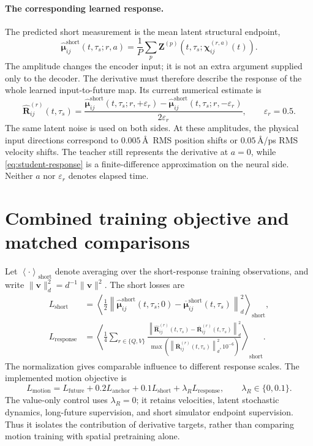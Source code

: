 \documentclass[11pt,a4paper]{article}
\newcommand{\avgs}[1]{\left\langle #1\right\rangle_{\mathrm{short}}}
\begin{document}
\newpage
\paragraph{The corresponding learned response.}
The predicted short measurement is the mean latent structural endpoint,
\[
\widehat{\boldsymbol\mu}^{\mathrm{short}}_{ij}(t,\tau_s;r,a)
=\frac1P\sum_p
\mathbf Z^{(p)}\!\left(t,\tau_s;
\boldsymbol\chi_{ij}^{(r,a)}(t)\right).
\]
The amplitude changes the encoder input; it is not an extra argument supplied
only to the decoder. The derivative must therefore describe the response of the
whole learned input-to-future map. Its current numerical estimate is
\begin{equation}
\widehat{\mathbf R}^{(r)}_{ij}(t,\tau_s)=
\frac{\widehat{\boldsymbol\mu}^{\mathrm{short}}_{ij}(t,\tau_s;r,+\varepsilon_r)
     -\widehat{\boldsymbol\mu}^{\mathrm{short}}_{ij}(t,\tau_s;r,-\varepsilon_r)}
     {2\varepsilon_r},
\qquad \varepsilon_r=0.5.
\label{eq:student-response}
\end{equation}
The same latent noise is used on both sides. At these amplitudes, the physical
input directions correspond to $0.005$\,\AA\ RMS position shifts or
$0.05$\,\AA/ps RMS velocity shifts. The teacher still represents the derivative
at $a=0$, while \eqref{eq:student-response} is a finite-difference approximation
on the neural side. Neither $a$ nor $\varepsilon_r$ denotes elapsed time.

\section{Combined training objective and matched comparisons}

Let $\avgs{\cdot}$ denote averaging over the short-response training observations,
and write $\|\mathbf v\|_d^2=d^{-1}\|\mathbf v\|^2$. The short losses are
\begin{align}
L_{\mathrm{short}}
 &=\avgs{\frac12\left\|
 \widehat{\boldsymbol\mu}^{\mathrm{short}}_{ij}(t,\tau_s;0)
 -\overline{\boldsymbol\mu}^{\mathrm{short}}_{ij}(t,\tau_s)
 \right\|_d^2},\\
L_{\mathrm{response}}
 &=\avgs{\frac14\sum_{r\in\{Q,V\}}
 \frac{\left\|\widehat{\mathbf R}^{(r)}_{ij}(t,\tau_s)
                   -\overline{\mathbf R}^{(r)}_{ij}(t,\tau_s)\right\|_d^2}
 {\max\!\left(\left\|\overline{\mathbf R}^{(r)}_{ij}(t,\tau_s)\right\|_d^2,10^{-6}\right)}}.
\end{align}
The normalization gives comparable influence to different response scales.
The implemented motion objective is
\begin{equation}
\boxed{
L_{\mathrm{motion}}=L_{\mathrm{future}}
 +0.2L_{\mathrm{anchor}}+0.1L_{\mathrm{short}}
 +\lambda_R L_{\mathrm{response}},
\qquad \lambda_R\in\{0,0.1\}.
}
\label{eq:total}
\end{equation}
The value-only control uses $\lambda_R=0$; it retains velocities, latent stochastic
dynamics, long-future supervision, and short simulator endpoint supervision.
Thus it isolates the contribution of derivative targets, rather than comparing
motion training with spatial pretraining alone.
\end{document}
